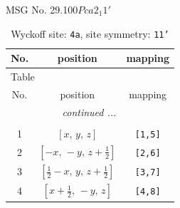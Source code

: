 \documentclass[fleqn,8pt]{jsarticle}
\begin{document}
\setcounter{MaxMatrixCols}{32}

\renewcommand{\tablename}{Table~}
\renewcommand{\figurename}{Figure~}
\begin{center}
\LARGE
MSG No. 29.100\quad$Pca2_{1}1'$
\end{center}
\renewcommand{\arraystretch}{1.2}
\begin{longtable}{ccc}
\caption{Wyckoff site: {\tt 4a}, site symmetry: {\tt 11'}}
 \\
 \hline \hline
No. & position & mapping \\ \hline \endfirsthead

\multicolumn{2}{l}{\tablename\ \thetable{}} \\
 \hline \hline
No. & position & mapping \\ \hline \endhead

 \hline \hline
\multicolumn{2}{r}{\footnotesize\it continued ...} \\ \endfoot

 \hline \hline
\multicolumn{2}{r}{} \\ \endlastfoot

1 & $\left[ x,\, y,\, z \right]$ & {\tt [1,5]} \\ \hline
2 & $\left[ - x,\, - y,\, z + \frac{1}{2} \right]$ & {\tt [2,6]} \\ \hline
3 & $\left[ \frac{1}{2} - x,\, y,\, z + \frac{1}{2} \right]$ & {\tt [3,7]} \\ \hline
4 & $\left[ x + \frac{1}{2},\, - y,\, z \right]$ & {\tt [4,8]} \\
\end{longtable}
\end{document}
